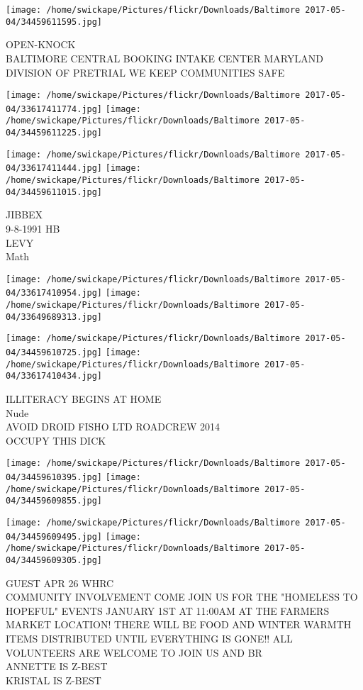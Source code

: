 \documentclass[10pt,letterpaper]{article}
\begin{document}
\vspace{0.25in}
\texttt{[image: /home/swickape/Pictures/flickr/Downloads/Baltimore 2017-05-04/34459611595.jpg]}

OPEN{-}KNOCK\\
BALTIMORE CENTRAL BOOKING INTAKE CENTER MARYLAND DIVISION OF PRETRIAL WE KEEP COMMUNITIES SAFE\\
\pagebreak

\texttt{[image: /home/swickape/Pictures/flickr/Downloads/Baltimore 2017-05-04/33617411774.jpg]}
\texttt{[image: /home/swickape/Pictures/flickr/Downloads/Baltimore 2017-05-04/34459611225.jpg]}

\texttt{[image: /home/swickape/Pictures/flickr/Downloads/Baltimore 2017-05-04/33617411444.jpg]}
\texttt{[image: /home/swickape/Pictures/flickr/Downloads/Baltimore 2017-05-04/34459611015.jpg]}

JIBBEX\\
9{-}8{-}1991 HB\\
LEVY\\
Math\\
\pagebreak

\texttt{[image: /home/swickape/Pictures/flickr/Downloads/Baltimore 2017-05-04/33617410954.jpg]}
\texttt{[image: /home/swickape/Pictures/flickr/Downloads/Baltimore 2017-05-04/33649689313.jpg]}

\texttt{[image: /home/swickape/Pictures/flickr/Downloads/Baltimore 2017-05-04/34459610725.jpg]}
\texttt{[image: /home/swickape/Pictures/flickr/Downloads/Baltimore 2017-05-04/33617410434.jpg]}

ILLITERACY BEGINS AT HOME\\
Nude\\
AVOID DROID FISHO LTD ROADCREW 2014\\
OCCUPY THIS DICK\\
\pagebreak

\texttt{[image: /home/swickape/Pictures/flickr/Downloads/Baltimore 2017-05-04/34459610395.jpg]}
\texttt{[image: /home/swickape/Pictures/flickr/Downloads/Baltimore 2017-05-04/34459609855.jpg]}

\texttt{[image: /home/swickape/Pictures/flickr/Downloads/Baltimore 2017-05-04/34459609495.jpg]}
\texttt{[image: /home/swickape/Pictures/flickr/Downloads/Baltimore 2017-05-04/34459609305.jpg]}

GUEST APR 26 WHRC\\
COMMUNITY INVOLVEMENT COME JOIN US FOR THE "HOMELESS TO HOPEFUL" EVENTS JANUARY 1ST AT 11:00AM AT THE FARMERS MARKET LOCATION!  THERE WILL BE FOOD AND WINTER WARMTH ITEMS DISTRIBUTED UNTIL EVERYTHING IS GONE!!  ALL VOLUNTEERS ARE WELCOME TO JOIN US AND BR\\
ANNETTE IS Z{-}BEST\\
KRISTAL IS Z{-}BEST\\
\pagebreak
\end{document}
